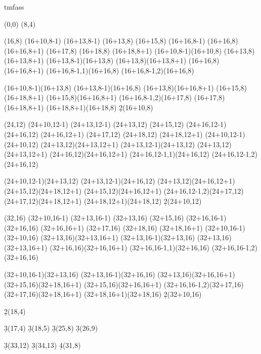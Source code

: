 \documentclass{article}
\begin{document}
\begin{sseqdata}[yscale=0.8, xscale=0.5]{tmfass}
\def\towergroupb(#1,#2){
    \towergroupa(#1,#2)
    \place1(#1+10,#2-1)
    \place1(#1+13,#2-1)
    \place1(#1+13,#2)
    \place1(#1+15,#2)
    \place2(#1+16,#2-1)
    \place1(#1+16,#2)
    \place1(#1+16,#2+1)
    \place1(#1+17,#2)
    \place1(#1+18,#2)
    \place1(#1+18,#2+1)
    \structline(#1+10,#2-1)(#1+10,#2)
    \structline(#1+13,#2)(#1+13,#2+1)
    \structline(#1+13,#2-1)(#1+13,#2)
    \structline(#1+13,#2)(#1+13,#2+1)
    \structline(#1+16,#2)(#1+16,#2+1)
    \structline(#1+16,#2-1,1)(#1+16,#2)
    \structline(#1+16,#2-1,2)(#1+16,#2)

    \structline(#1+10,#2-1)(#1+13,#2)
    \structline(#1+13,#2-1)(#1+16,#2)
    \structline(#1+13,#2)(#1+16,#2+1)
    \structline(#1+15,#2)(#1+18,#2+1)
    \structline(#1+15,#2)(#1+16,#2+1)
    \structline(#1+16,#2-1,2)(#1+17,#2)
    \structline(#1+17,#2)(#1+18,#2+1)
    \structline(#1+18,#2+1)(#1+18,#2)
    \d2(#1+10,#2)

}

\towergroup(0,0)
\towergroupa(8,4)
\towergroupb(16,8)
\towergroupb(24,12)
\towergroupb(32,16)

\d2(18,4)

\d3(17,4)
\d3(18,5)
\d3(25,8)
\d3(26,9)

\d3(33,12)
\d3(34,13)
\d4(31,8)
\end{sseqdata}

\newpage
{}
\newpage
{}
\end{document}
